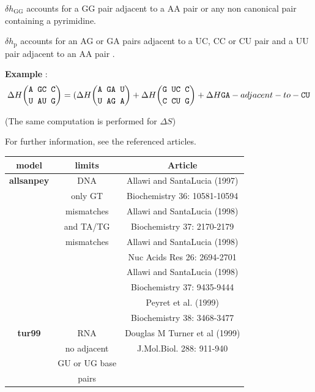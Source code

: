 \documentclass{article}
\begin{document}
$\delta{}h_\mathrm{GG}$ accounts for a GG pair adjacent to a AA pair or any non canonical pair containing a pyrimidine.

$\delta{}h_\mathrm{p}$ accounts for an AG or GA pairs adjacent to a UC, CC or CU pair and a UU pair adjacent to an AA pair .

\textbf{Example} :
\begin{multline*}
\Delta H {\mbox{\texttt{A GC C}} \choose \mbox{\texttt{U AU G}}} =
( \Delta H {\mbox{\texttt{A GA U}} \choose \mbox{\texttt{U AG A}}} + 
\Delta H {\mbox{\texttt{G UC C}} \choose \mbox{\texttt{C CU G}}} +
\Delta H {\mbox{\texttt{GA}} -adjacent-to- \mbox{\texttt{CU}} } \\
\end{multline*}

       (The same computation is performed for $\Delta S$)
       
For further information, see the referenced articles.

\begin{table}[hc]
\begin{tabular}[h]{| c | c | c |}
\textbf{model} & \textbf{limits} & \textbf{Article} \\
 \hline
\textbf{allsanpey} & DNA & Allawi and SantaLucia (1997) \\
 & only GT & Biochemistry 36: 10581-10594 \\
 & mismatches & Allawi and SantaLucia (1998) \\
 & and TA/TG & Biochemistry 37: 2170-2179 \\
 & mismatches & Allawi and SantaLucia (1998) \\
 & & Nuc Acids Res 26: 2694-2701 \\
 & & Allawi and SantaLucia (1998) \\
 & & Biochemistry 37: 9435-9444 \\
 & & Peyret et al. (1999) \\
 & & Biochemistry 38: 3468-3477\\
 \hline
\textbf{tur99} & RNA & Douglas M Turner et al (1999) \\
 & no adjacent & J.Mol.Biol.  288: 911-940 \\
 & GU or UG base & \\
 &  pairs & \\
 \hline
\end{tabular}
\end{table}
\end{document}
